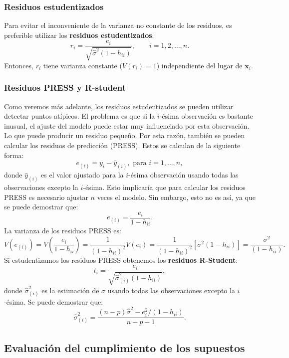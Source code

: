 \documentclass[
]{article}
\begin{document}
\hypertarget{residuos-estudentizados}{%
\subsubsection{Residuos estudentizados}\label{residuos-estudentizados}}

Para evitar el inconveniente de la varianza no constante de los residuos, es preferible utilizar los \textbf{residuos estudentizados}:
\[
r_{i} = \frac{e_{i}}{\sqrt{\hat{\sigma}^{2}(1-h_{ii})}}, \qquad i=1,2,\ldots,n.
\]
Entonces, \(r_{i}\) tiene varianza constante (\(V(r_{i})=1\)) independiente del lugar de \(\boldsymbol x_{i}\).

\hypertarget{residuos-press-y-r-student}{%
\subsubsection{Residuos PRESS y R-student}\label{residuos-press-y-r-student}}

Como veremos más adelante, los residuos estudentizados se pueden utilizar detectar puntos atípicos. El problema es que si la \(i\)-ésima observación es bastante inusual, el ajuste del modelo puede estar muy influenciado por esta observación. Lo que puede producir un residuo pequeño. Por esta razón, también se pueden calcular los residuos de predicción (PRESS). Estos se calculan de la siguiente forma:
\[
e_{(i)} = y_{i} - \widehat{y}_{(i)}, \mbox{ para }i=1,\ldots,n,
\]
donde \(\widehat{y}_{(i)}\) es el valor ajustado para la \(i\)-ésima observación usando todas las observaciones excepto la \(i\)-ésima. Esto implicaría que para calcular los residuos PRESS es necesario ajustar \(n\) veces el modelo. Sin embargo, esto no es así, ya que se puede demostrar que:
\[
e_{(i)} = \frac{e_{i}}{1-h_{ii}}.
\]
La varianza de los residuos PRESS es:
\[
V(e_{(i)}) = V\left( \frac{e_{i}}{1-h_{ii}} \right) = \frac{1}{(1-h_{ii})^{2}}V(e_{i}) = \frac{1}{(1-h_{ii})^{2}} [\sigma^{2}(1-h_{ii})] = \frac{\sigma^{2}}{(1-h_{ii})}.
\]
Si estudentizamos los residuos PRESS obtenemos los \textbf{residuos R-Student}:
\[
t_{i} = \frac{e_{i}}{\sqrt{\widehat{\sigma}^{2}_{(i)}(1-h_{ii})}},
\]
donde \(\widehat{\sigma}^{2}_{(i)}\) es la estimación de \(\sigma\) usando todas las observaciones excepto la \(i\)-ésima. Se puede demostrar que:
\[
\widehat{\sigma}^{2}_{(i)} = \frac{(n-p)\widehat{\sigma}^{2} - e^{2}_{i}/(1-h_{ii})}{n-p-1}.
\]

\hypertarget{evaluaciuxf3n-del-cumplimiento-de-los-supuestos}{%
\subsection{Evaluación del cumplimiento de los supuestos}\label{evaluaciuxf3n-del-cumplimiento-de-los-supuestos}}
\end{document}
